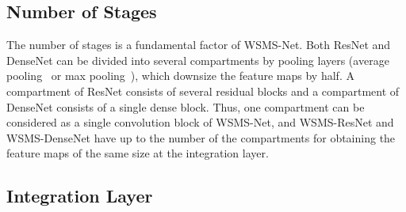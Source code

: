 \documentclass[journal]{IEEEtran}
\begin{document}
\subsection{Number of Stages}

The number of stages is a fundamental factor of WSMS-Net.
Both ResNet and DenseNet can be divided into several compartments by pooling layers (average pooling~\cite{LeCun1989} or max pooling~\cite{Riesenhuber1999}), which downsize the feature maps by half.
A compartment of ResNet consists of several residual blocks and a compartment of DenseNet consists of a single dense block.
Thus, one compartment can be considered as a single convolution block of WSMS-Net, and  WSMS-ResNet and WSMS-DenseNet have up to the number of the compartments for obtaining the feature maps of the same size at the integration layer.

\subsection{Integration Layer}
\end{document}
